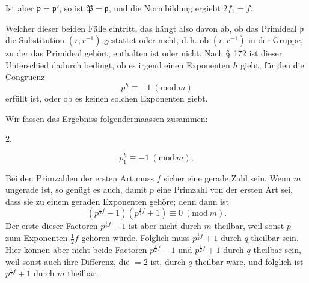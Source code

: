 Ist aber $\mathfrak{p}=\mathfrak{p}'$, so ist $\mathfrak{P}=\mathfrak{p}$, und die Normbildung ergiebt $2f_1=f$.

Welcher dieser beiden F\"alle eintritt, das h\"angt also davon ab, ob das Primideal $\mathfrak{p}$ die Substitution $(r,r^{-1})$ gestattet oder nicht, d.\,h. ob $(r,r^{-1})$ in der Gruppe, zu der das Primideal geh\"ort, enthalten ist oder nicht. Nach \S.\,172 ist dieser Unterschied dadurch bedingt, ob es irgend einen Exponenten $h$ giebt, f\"ur den die Congruenz
\[
p^h \equiv -1 \ (\mathrm{mod}\ m)
\]
erf\"ullt ist, oder ob es keinen solchen Exponenten giebt.

Wir fassen das Ergebniss folgendermaassen zusammen:

2. 

\[
p_1^h \equiv -1 \ (\mathrm{mod}\ m),
\]



Bei den Primzahlen der ersten Art muss $f$ sicher eine gerade Zahl sein. Wenn $m$ ungerade ist, so gen\"ugt es auch, damit $p$ eine Primzahl von der ersten Art sei, dass sie zu einem geraden Exponenten geh\"ore; denn dann ist
\[
(p^{\frac12 f}-1)(p^{\frac12 f}+1)\equiv 0\ (\mathrm{mod}\ m).
\]
Der erste dieser Factoren $p^{\frac12 f}-1$ ist aber nicht durch $m$ theilbar, weil sonst $p$ zum Exponenten $\frac12 f$ geh\"oren w\"urde. Folglich muss $p^{\frac12 f}+1$ durch $q$ theilbar sein. Hier k\"onnen aber nicht beide Factoren $p^{\frac12 f}-1$ und $p^{\frac12 f}+1$ durch $q$ theilbar sein, weil sonst auch ihre Differenz, die $=2$ ist, durch $q$ theilbar w\"are, und folglich ist $p^{\frac12 f}+1$ durch $m$ theilbar.
